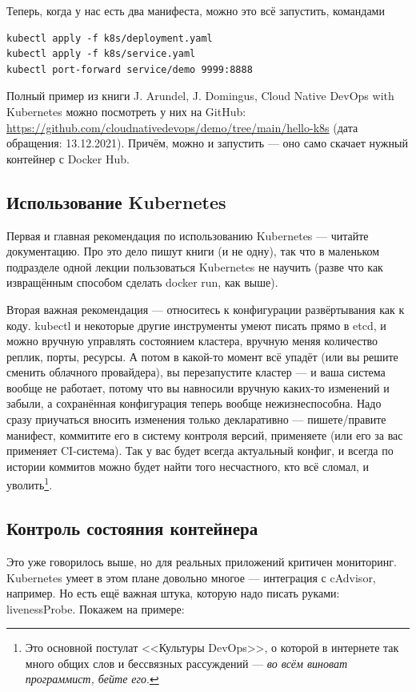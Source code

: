 \documentclass[a5paper]{article}
\begin{document}
Теперь, когда у нас есть два манифеста, можно это всё запустить, командами

\begin{verbatim}
kubectl apply -f k8s/deployment.yaml
kubectl apply -f k8s/service.yaml
kubectl port-forward service/demo 9999:8888
\end{verbatim}

Полный пример из книги J. Arundel, J. Domingus, Cloud Native DevOps with Kubernetes можно посмотреть у них на GitHub: \url{https://github.com/cloudnativedevops/demo/tree/main/hello-k8s} (дата обращения: 13.12.2021). Причём, можно и запустить --- оно само скачает нужный контейнер с Docker Hub. 

\subsection{Использование Kubernetes}

Первая и главная рекомендация по использованию Kubernetes --- читайте документацию. Про это дело пишут книги (и не одну), так что в маленьком подразделе одной лекции пользоваться Kubernetes не научить (разве что как извращённым способом сделать docker run, как выше). 

Вторая важная рекомендация --- относитесь к конфигурации развёртывания как к коду. kubectl и некоторые другие инструменты умеют писать прямо в etcd, и можно вручную управлять состоянием кластера, вручную меняя количество реплик, порты, ресурсы. А потом в какой-то момент всё упадёт (или вы решите сменить облачного провайдера), вы перезапустите кластер --- и ваша система вообще не работает, потому что вы навносили вручную каких-то изменений и забыли, а сохранённая конфигурация теперь вообще нежизнеспособна. Надо сразу приучаться вносить изменения только декларативно --- пишете/правите манифест, коммитите его в систему контроля версий, применяете (или его за вас применяет CI-система). Так у вас будет всегда актуальный конфиг, и всегда по истории коммитов можно будет найти того несчастного, кто всё сломал, и уволить\footnote{Это основной постулат <<Культуры DevOps>>, о которой в интернете так много общих слов и бессвязных рассуждений --- \emph{во всём виноват программист, бейте его}.}.

\subsection{Контроль состояния контейнера}

Это уже говорилось выше, но для реальных приложений критичен мониторинг. Kubernetes умеет в этом плане довольно многое --- интеграция с cAdvisor, например. Но есть ещё важная штука, которую надо писать руками: livenessProbe. Покажем на примере:
\end{document}
